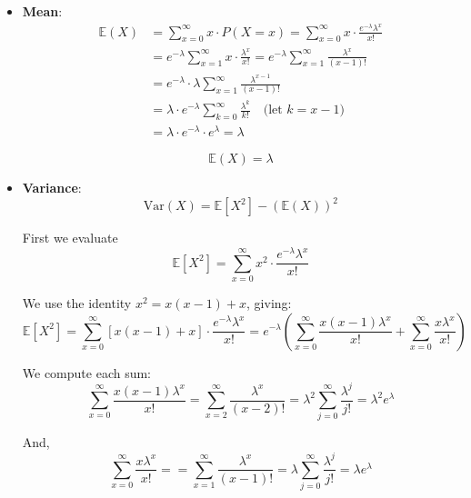 \documentclass[twoside]{book}
\begin{document}
\begin{itemize}
    \item \textbf{Mean}:
    \begin{align*}
\mathbb{E}(X) &= \sum_{x=0}^{\infty} x \cdot P(X = x) = \sum_{x=0}^{\infty} x \cdot \frac{e^{-\lambda} \lambda^x}{x!} \\
&= e^{-\lambda} \sum_{x=1}^{\infty} x \cdot \frac{\lambda^x}{x!} = e^{-\lambda} \sum_{x=1}^{\infty} \frac{\lambda^x}{(x-1)!} \\
&= e^{-\lambda} \cdot \lambda \sum_{x=1}^{\infty} \frac{\lambda^{x-1}}{(x-1)!} \\
&= \lambda \cdot e^{-\lambda} \sum_{k=0}^{\infty} \frac{\lambda^k}{k!} \quad \text{(let } k = x - 1 \text{)} \\
&= \lambda \cdot e^{-\lambda} \cdot e^{\lambda} = \lambda
\end{align*}

    \begin{textbox}
        \[
    \mathbb{E}(X) = \lambda
    \]
    \end{textbox}

    \item \textbf{Variance}:
    \[
    \text{Var}(X) = \mathbb{E}[X^2] - (\mathbb{E}(X))^2
    \]

    First we evaluate
\[
\mathbb{E}[X^2] = \sum_{x=0}^{\infty} x^2 \cdot \frac{e^{-\lambda} \lambda^x}{x!}
\]

We use the identity \(x^2 = x(x - 1) + x\), giving:
\[
\mathbb{E}[X^2] = \sum_{x=0}^{\infty} \left[x(x - 1) + x\right] \cdot \frac{e^{-\lambda} \lambda^x}{x!}
= e^{-\lambda} \left( \sum_{x=0}^{\infty} \frac{x(x-1) \lambda^x}{x!} + \sum_{x=0}^{\infty} \frac{x \lambda^x}{x!} \right)
\]

We compute each sum:
\[
\sum_{x=0}^{\infty} \frac{x(x-1) \lambda^x}{x!} =\sum_{x=2}^{\infty} \frac{\lambda^x}{(x-2)!}=\lambda^2\sum_{j=0}^{\infty} \frac{\lambda^j}{j!} =\lambda^2 e^{\lambda}
\]

And,
$$\sum_{x=0}^{\infty} \frac{x \lambda^x}{x!} = =\sum_{x=1}^{\infty} \frac{\lambda^x}{(x-1)!}=\lambda\sum_{j=0}^{\infty} \frac{\lambda^j}{j!} =\lambda e^{\lambda}$$


\end{itemize}
\end{document}
